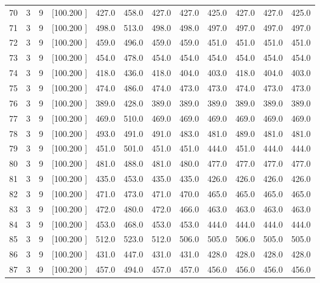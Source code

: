 \documentclass[12pt,a4paper]{article}
\begin{document}
\begin{center}
{\begin{tabular}{r r r r r r r r r r r r}
  70&  3&  9&[100.200   ]&   427.0&   458.0&   427.0&   427.0&   425.0&   427.0&   427.0&   425.0\\[-0.02in]
  71&  3&  9&[100.200   ]&   498.0&   513.0&   498.0&   498.0&   497.0&   497.0&   497.0&   497.0\\[-0.02in]
  72&  3&  9&[100.200   ]&   459.0&   496.0&   459.0&   459.0&   451.0&   451.0&   451.0&   451.0\\[-0.02in]
  73&  3&  9&[100.200   ]&   454.0&   478.0&   454.0&   454.0&   454.0&   454.0&   454.0&   454.0\\[-0.02in]
  74&  3&  9&[100.200   ]&   418.0&   436.0&   418.0&   404.0&   403.0&   418.0&   404.0&   403.0\\[-0.02in]
  75&  3&  9&[100.200   ]&   474.0&   486.0&   474.0&   473.0&   473.0&   474.0&   473.0&   473.0\\[-0.02in]
  76&  3&  9&[100.200   ]&   389.0&   428.0&   389.0&   389.0&   389.0&   389.0&   389.0&   389.0\\[-0.02in]
  77&  3&  9&[100.200   ]&   469.0&   510.0&   469.0&   469.0&   469.0&   469.0&   469.0&   469.0\\[-0.02in]
  78&  3&  9&[100.200   ]&   493.0&   491.0&   491.0&   483.0&   481.0&   489.0&   481.0&   481.0\\[-0.02in]
  79&  3&  9&[100.200   ]&   451.0&   501.0&   451.0&   451.0&   444.0&   451.0&   444.0&   444.0\\[-0.02in]
  80&  3&  9&[100.200   ]&   481.0&   488.0&   481.0&   480.0&   477.0&   477.0&   477.0&   477.0\\[-0.02in]
  81&  3&  9&[100.200   ]&   435.0&   453.0&   435.0&   435.0&   426.0&   426.0&   426.0&   426.0\\[-0.02in]
  82&  3&  9&[100.200   ]&   471.0&   473.0&   471.0&   470.0&   465.0&   465.0&   465.0&   465.0\\[-0.02in]
  83&  3&  9&[100.200   ]&   472.0&   480.0&   472.0&   466.0&   463.0&   463.0&   463.0&   463.0\\[-0.02in]
  84&  3&  9&[100.200   ]&   453.0&   468.0&   453.0&   453.0&   444.0&   444.0&   444.0&   444.0\\[-0.02in]
  85&  3&  9&[100.200   ]&   512.0&   523.0&   512.0&   506.0&   505.0&   506.0&   505.0&   505.0\\[-0.02in]
  86&  3&  9&[100.200   ]&   431.0&   447.0&   431.0&   431.0&   428.0&   428.0&   428.0&   428.0\\[-0.02in]
  87&  3&  9&[100.200   ]&   457.0&   494.0&   457.0&   457.0&   456.0&   456.0&   456.0&   456.0\\[-0.02in]

\end{tabular}}
\end{center}
\end{document}
